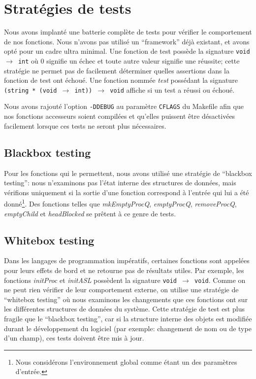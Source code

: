 \documentclass[10pt]{article}
\begin{document}
\section{Stratégies de tests}

Nous avons implanté une batterie complète de tests pour vérifier le
comportement de nos fonctions.  Nous n'avons pas utilisé un
``framework'' déjà existant, et avons opté pour un cadre ultra
minimal.  Une fonction de test possède la signature {\tt void $\to$
  int} où 0 signifie un échec et toute autre valeur signifie une
réussite; cette stratégie ne permet pas de facilement déterminer
quelles assertions dans la fonction de test ont échoué.  Une fonction
nommée \emph{test} possédant la signature {\tt (string * (void $\to$
  int)) $\to$ void} affiche si un test a réussi ou échoué.

Nous avons rajouté l'option {\tt -DDEBUG} au paramètre {\tt CFLAGS} du
Makefile afin que nos fonctions accesseurs soient compilées et
qu'elles puissent être désactivées facilement lorsque ces tests ne
seront plus nécessaires.

\subsection{Blackbox testing}

Pour les fonctions qui le permettent, nous avons utilisé une stratégie
de ``blackbox testing'': nous n'examinons pas l'état interne des
structures de données, mais vérifions uniquement si la sortie d'une
fonction correspond à l'entrée qui lui a été donné\footnote{Nous
  considérons l'environnement global comme étant un des paramètres
  d'entrée.}.  Des fonctions telles que \emph{mkEmptyProcQ},
\emph{emptyProcQ}, \emph{removeProcQ}, \emph{emptyChild} et
\emph{headBlocked} se prêtent à ce genre de tests.

\subsection{Whitebox testing}

Dans les langages de programmation impératifs, certaines fonctions
sont appelées pour leurs effets de bord et ne retourne pas de
résultats utiles.  Par exemple, les fonctions \emph{initProc} et
\emph{initASL} possèdent la signature {\tt void $\to$ void}.  Comme on
ne peut rien vérifier de leur comportement externe, on utilise une
stratégie de ``whitebox testing'' où nous examinons les changements
que ces fonctions ont sur les différentes structures de données du
système.  Cette stratégie de test est plus fragile que le ``blackbox
testing'', car si la structure interne des objets est modifiée durant
le développement du logiciel (par exemple: changement de nom ou de
type d'un champ), ces tests doivent être mis à jour.
\end{document}
